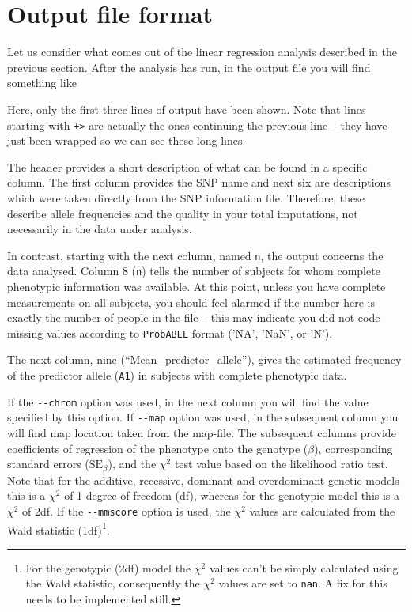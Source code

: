 \documentclass[12pt,a4paper]{article}
\newcommand{\PA}{\texttt{ProbABEL}}
\begin{document}
\section{Output file format}
Let us consider what comes out of the linear regression analysis
described in the previous section. After the analysis has run, in
the output file you will find something like
\begin{small}

\end{small}

Here, only the first three lines of output have been shown. Note that lines
starting with \texttt{+>} are actually the ones continuing the
previous line -- they have just been wrapped so we can see
these long lines.

The header provides a short description of what can be found in a
specific column. The first column provides the SNP name and
next six are descriptions which were taken directly from the
SNP information file. Therefore, these describe allele frequencies and
the quality in your total imputations, not necessarily in the data under
analysis.

In contrast, starting with the next column, named \texttt{n},
the output concerns the data analysed. Column 8 (\texttt{n}) tells the
number of subjects for whom complete phenotypic information was
available. At this point, unless you have complete measurements on all
subjects, you should feel alarmed if the number here is exactly the
number of people in the file -- this may indicate you did not code
missing values according to \PA{} format ('NA', 'NaN', or 'N').

The next column, nine (``Mean\_predictor\_allele''), gives the estimated
frequency of the predictor allele (\texttt{A1}) in subjects with complete
phenotypic data.

If the \lstinline{--chrom} option was used, in the next column you will
find the value specified by this option. If \lstinline{--map} option was
used, in the subsequent column you will find map location taken from
the map-file. The subsequent columns provide coefficients of
regression of the phenotype onto the genotype ($\beta$), corresponding
standard errors ($\text{SE}_\beta$), and the $\chi^2$ test value based
on the likelihood ratio test. Note that for the additive, recessive,
dominant and overdominant genetic models this is a $\chi^2$ of 1
degree of freedom (df), whereas for the genotypic model this is a
$\chi^2$ of 2df. If the \lstinline{--mmscore} option is used, the
$\chi^2$ values are calculated from the Wald statistic
(1df)\footnote{For the genotypic (2df) model the $\chi^2$ values can't
  be simply calculated using the Wald statistic, consequently the
  $\chi^2$ values are set to \texttt{nan}. A fix for this needs to be
  implemented still.}.
\end{document}
